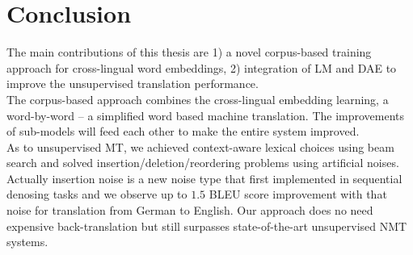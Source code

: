 \chapter{Conclusion}
%
%

The main contributions of this thesis are 1) a novel corpus-based training approach for cross-lingual word embeddings, 2) integration of LM and DAE to improve the unsupervised translation performance. \\
The corpus-based approach combines the cross-lingual embedding learning, a word-by-word -- a simplified word based machine translation. The improvements of sub-models will feed each other to make the entire system improved. \\
As to unsupervised MT, we achieved context-aware lexical choices using beam search and solved insertion/deletion/reordering problems using artificial noises. Actually insertion noise is a new noise type that first implemented in sequential denosing tasks and we observe up to $1.5$ BLEU score improvement with that noise for translation from German to English.  Our approach does no need expensive back-translation but still surpasses state-of-the-art unsupervised NMT systems.


